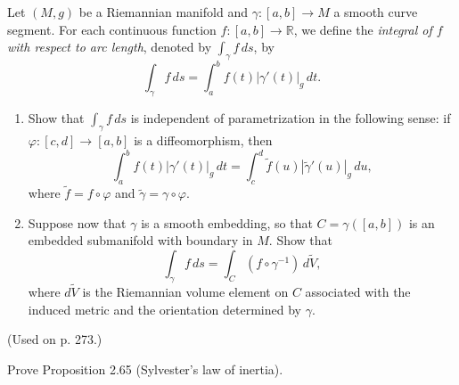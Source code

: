 \begin{exercise}\label{prob:arc-length-integral}
Let $(M,g)$ be a Riemannian manifold and $\gamma: [a,b] \to M$ a smooth curve segment. For each continuous function $f: [a,b] \to \mathbb{R}$, we define the \textit{integral of $f$ with respect to arc length}, denoted by $\int_\gamma f \, ds$, by
\[
\int_\gamma f \, ds = \int_a^b f(t) |\gamma'(t)|_g \, dt.
\]

\begin{enumerate}
\item[(a)] Show that $\int_\gamma f \, ds$ is independent of parametrization in the following sense: if $\varphi: [c,d] \to [a,b]$ is a diffeomorphism, then
\[
\int_a^b f(t) |\gamma'(t)|_g \, dt = \int_c^d \tilde{f}(u) |\tilde{\gamma}'(u)|_g \, du,
\]
where $\tilde{f} = f \circ \varphi$ and $\tilde{\gamma} = \gamma \circ \varphi$.
\item[(b)] Suppose now that $\gamma$ is a smooth embedding, so that $C = \gamma([a,b])$ is an embedded submanifold with boundary in $M$. Show that
\[
\int_\gamma f \, ds = \int_C (f \circ \gamma^{-1}) \, d\tilde{V},
\]
where $d\tilde{V}$ is the Riemannian volume element on $C$ associated with the induced metric and the orientation determined by $\gamma$.
\end{enumerate}

(Used on p. 273.)
\end{exercise}

\begin{exercise}\label{prob:sylvesters-law-inertia}
\leanok
{}

Prove Proposition 2.65 (Sylvester's law of inertia).
\end{exercise}

